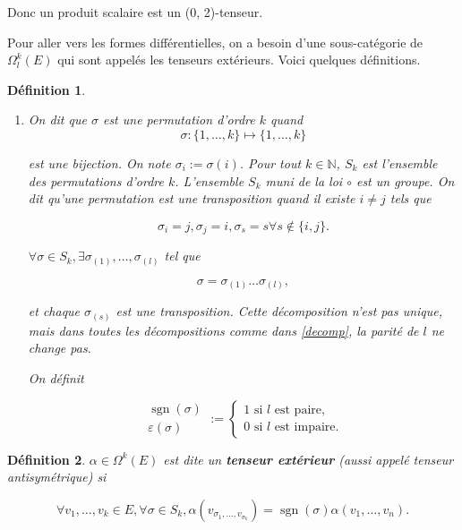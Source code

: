 \documentclass[french]{article}
\newtheorem{definition}{Définition}[section]
\begin{document}
Donc un produit scalaire est un (0, 2)-tenseur.

Pour aller vers les formes différentielles, on a besoin d'une sous-catégorie de \(\Omega _{l} ^{k}(E)\) qui sont appelés les tenseurs extérieurs. Voici quelques définitions.

\begin{definition}
  \begin{enumerate}
    \item On dit que \(\sigma\) est une permutation d'ordre \(k\) quand
    \[\sigma : \{1, \dots, k \} \longmapsto \{1, \dots, k \}\]

    est une bijection. On note \(\sigma _{i}:= \sigma(i)\). Pour tout \(k \in \mathbb{N}\), \(S_k\) est l'ensemble des permutations d'ordre \(k\). L'ensemble \(S_k\) muni de la loi \(\circ\) est un groupe. On dit qu'une permutation est une transposition quand il existe \(i \neq j\) tels que

    \[\sigma _{i} = j, \sigma_j = i, \sigma _{s} = s \forall s \notin \{ i,j \}. \]

    \(\forall \sigma \in S_k, \exists \sigma _{(1)}, \dots, \sigma _{(l)}\) tel que

    \begin{equation}\label{decomp}
      \sigma = \sigma _{(1)} \dots \sigma _{(l)},
    \end{equation}

    et chaque \(\sigma _{(s)}\) est une transposition. Cette décomposition n'est pas unique, mais dans toutes les décompositions comme dans \ref{decomp}, la parité de \(l\) ne change pas.

    On définit

    \[\begin{matrix}
      \operatorname{sgn}(\sigma) \\
      \varepsilon(\sigma)
    \end{matrix}:= \begin{cases}
      1 \text{ si } l \text{ est paire,} \\
      0 \text{ si } l \text{ est impaire.}
    \end{cases}\]

  \end{enumerate}
\end{definition}

\begin{definition}
  \( \alpha \in \Omega ^{k}(E)\) est dite un \textbf{tenseur extérieur} (aussi appelé tenseur antisymétrique) si

  \[\forall v_1, \dots, v_k \in E, \forall \sigma \in S_k, \alpha(v _{\sigma_1, \dots, v _{\sigma_k}}) = \operatorname{sgn}(\sigma) \alpha(v_1, \dots, v_n).\]
\end{definition}
\end{document}

